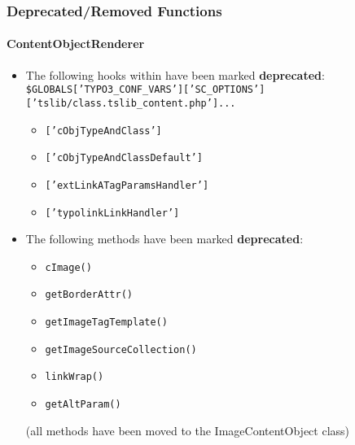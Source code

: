 \begin{frame}[fragile]
	\frametitle{Deprecated/Removed Functions}
	\framesubtitle{ContentObjectRenderer}

	\begin{itemize}
		\item The following hooks within have been marked \textbf{deprecated}:\newline
			\tiny
				\texttt{\$GLOBALS['TYPO3\_CONF\_VARS']['SC\_OPTIONS']['tslib/class.tslib\_content.php']...}
			\normalsize

			\begin{itemize}\smaller
				\item \texttt{['cObjTypeAndClass']}
				\item \texttt{['cObjTypeAndClassDefault']}
				\item \texttt{['extLinkATagParamsHandler']}
				\item \texttt{['typolinkLinkHandler']}
			\end{itemize}

		\item The following methods have been marked \textbf{deprecated}:

			\begin{itemize}\smaller
				\item \texttt{cImage()}
				\item \texttt{getBorderAttr()}
				\item \texttt{getImageTagTemplate()}
				\item \texttt{getImageSourceCollection()}
				\item \texttt{linkWrap()}
				\item \texttt{getAltParam()}
			\end{itemize}

			\smaller
				(all methods have been moved to the ImageContentObject class)
			\normalsize

	\end{itemize}

\end{frame}


